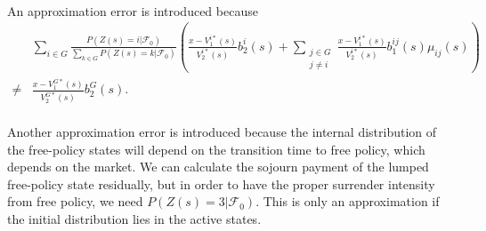 \documentclass[12pt]{article}
\theoremstyle{my_thm}
\theoremstyle{my_def}
\theoremstyle{my_thm2}
\begin{document}
\\[12pt]
An approximation error is introduced because
\begin{align*}
&\sum_{i \in G}\frac{P(Z(s)=i|\mathcal{F}_0)}{\sum_{k \in G}P(Z(s)=k|\mathcal{F}_0)}  \left( \frac{x-V_1^{i*}(s)}{V_2^{i*}(s)} b_2^i(s) + \sum_{ \substack{j \in G \\j \neq i}} \frac{x-V_1^{i*}(s)}{V_2^{i*}(s)}b_1^{ij}(s) \mu_{ij}(s) \right)
\\
\neq &
\frac{x-V_1^{G*}(s)}{V_2^{G*}(s)}b_2^G(s).
\end{align*}
\\[12pt]
Another approximation error is introduced because the internal distribution of the free-policy states will depend on the transition time to free policy, which depends on the market. We can calculate the sojourn payment of the lumped free-policy state residually, but in order to have the proper surrender intensity from free policy, we need $P(Z(s)=3|\mathcal{F}_0)$. This is only an approximation if the initial distribution lies in the active states.
\\[12pt]
\end{document}
